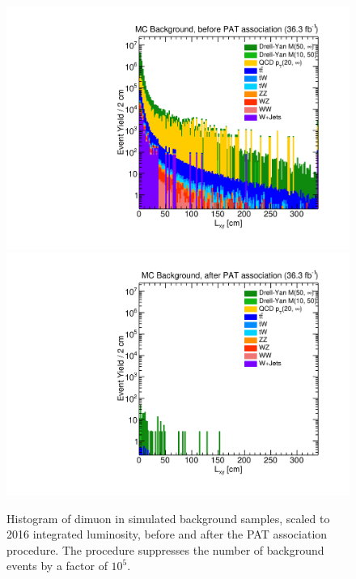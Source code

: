 \begin{figure}[p]
  \centering
  \includegraphics[width=\DSquareWidth]{figures/displaced/REPEFF_MC_Lxy-before.pdf}
  \hspace*{-2em}
  \includegraphics[width=\DSquareWidth]{figures/displaced/REPEFF_MC_Lxy-after.pdf}
  \caption[Histogram of dimuon \Lxy in simulated background samples before and after the PAT association procedure.]{Histogram of dimuon \Lxy in simulated background samples, scaled to 2016 integrated luminosity,  before and  after the PAT association procedure. The procedure suppresses the number of background events by a factor of $10^5$.}
  \label{fig:dd:REPEFF_MC_Lxy}
\end{figure}

